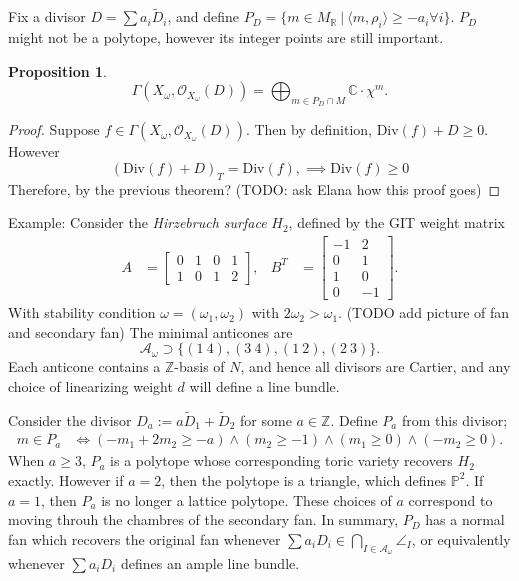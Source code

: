 \documentclass{article}
\newtheorem{prop}[theorem]{Proposition}
\theoremstyle{definition}
\theoremstyle{remark}
\numberwithin{theorem}{section}
\newcommand{\C}{\mathbb{C}}
\newcommand{\Z}{\mathbb{Z}}
\newcommand{\R}{\mathbb{R}}
\newcommand{\bP}{\mathbb{P}}
\newcommand{\OO}{\mathcal{O}}
\newcommand{\cA}{\mathcal{A}}
\newcommand{\Div}{\mathrm{Div}}
\begin{document}
	Fix a divisor $D=\sum a_i\tilde{D}_i$, and define $P_D =\{m\in M_\R ~|~ \langle m, \rho_i \rangle \geq -a_i \forall i\}$. $P_D$ might not be a polytope, however its integer points are still important. 
	\begin{prop}
		$$\Gamma(X_\omega, \OO_{X_\omega}(D)) = \bigoplus_{m\in P_D\cap M} \C\cdot \chi^m.$$
	\end{prop}
	\begin{proof}
		Suppose $f\in \Gamma(X_\omega, \OO_{X_\omega}(D))$. Then by definition, $\Div(f) + D \geq 0$. However 
		$$(\Div(f)+D)_T = \Div(f), \implies \Div(f)\geq 0$$
		Therefore, by the previous theorem? (TODO: ask Elana how this proof goes)
	\end{proof}
	Example: Consider the \emph{Hirzebruch surface} $H_2$, defined by the GIT weight matrix 
	\begin{align*}
		A &= \begin{bmatrix}
			0 & 1 & 0 & 1\\
			1 & 0 & 1 & 2
		\end{bmatrix}, & 
		B^T&= \begin{bmatrix}
			-1 & 2\\
			0 & 1\\
			1 & 0\\
			0 & -1
		\end{bmatrix}.
	\end{align*}
	With stability condition $\omega = (\omega_1,\omega_2)$ with $2\omega_2 > \omega_1$. (TODO add picture of fan and secondary fan) The minimal anticones are
	$$\cA_\omega \supset \{ (1~4), (3~4), (1~2), (2~3)\}.$$
	Each anticone contains a $\Z$-basis of $N$, and hence all divisors are Cartier, and any choice of linearizing weight $d$ will define a line bundle. \vspace{1em}
	
	Consider the divisor $D_a:= a\tilde{D}_1 + \tilde{D}_2$ for some $a\in\Z$. Define $P_a$ from this divisor; 
	\begin{align*}
		m\in P_a &\iff (-m_1+2m_2 \geq -a) \land (m_2\geq -1) \land (m_1\geq 0)\land (-m_2\geq 0).
	\end{align*}
	When $a\geq 3$, $P_a$ is a polytope whose corresponding toric variety recovers $H_2$ exactly. However if $a=2$, then the polytope is a triangle, which defines $\bP^2$. If $a=1$, then $P_a$ is no longer a lattice polytope. These choices of $a$ correspond to moving throuh the chambres of the secondary fan. In summary, $P_D$ has a normal fan which recovers the original fan whenever $\sum a_iD_i \in \bigcap_{I\in \cA_\omega}\angle_I$, or equivalently whenever $\sum a_i D_i$ defines an ample line bundle.
\end{document}
